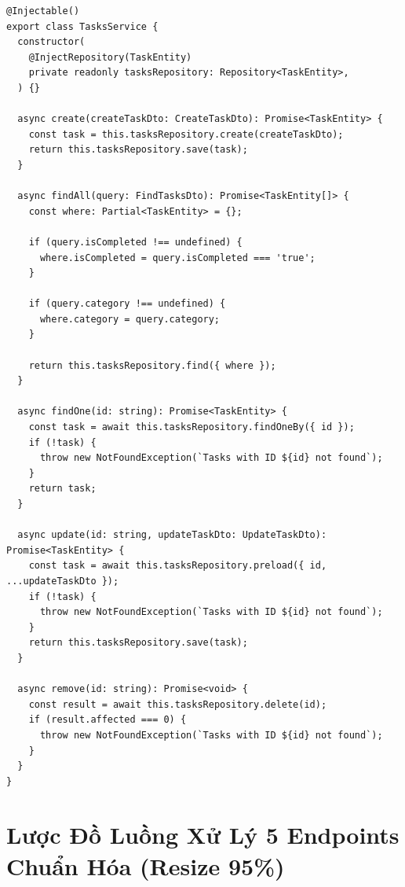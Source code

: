 \documentclass[12pt,a4paper,oneside]{book}
\begin{document}
\begin{codebox}
\begin{Verbatim}[fontsize=\small]
@Injectable()
export class TasksService {
  constructor(
    @InjectRepository(TaskEntity)
    private readonly tasksRepository: Repository<TaskEntity>,
  ) {}

  async create(createTaskDto: CreateTaskDto): Promise<TaskEntity> {
    const task = this.tasksRepository.create(createTaskDto);
    return this.tasksRepository.save(task);
  }

  async findAll(query: FindTasksDto): Promise<TaskEntity[]> {
    const where: Partial<TaskEntity> = {};

    if (query.isCompleted !== undefined) {
      where.isCompleted = query.isCompleted === 'true';
    }

    if (query.category !== undefined) {
      where.category = query.category;
    }

    return this.tasksRepository.find({ where });
  }

  async findOne(id: string): Promise<TaskEntity> {
    const task = await this.tasksRepository.findOneBy({ id });
    if (!task) {
      throw new NotFoundException(`Tasks with ID ${id} not found`);
    }
    return task;
  }

  async update(id: string, updateTaskDto: UpdateTaskDto): Promise<TaskEntity> {
    const task = await this.tasksRepository.preload({ id, ...updateTaskDto });
    if (!task) {
      throw new NotFoundException(`Tasks with ID ${id} not found`);
    }
    return this.tasksRepository.save(task);
  }

  async remove(id: string): Promise<void> {
    const result = await this.tasksRepository.delete(id);
    if (result.affected === 0) {
      throw new NotFoundException(`Tasks with ID ${id} not found`);
    }
  }
}
\end{Verbatim}
\end{codebox}

\section{Lược Đồ Luồng Xử Lý 5 Endpoints Chuẩn Hóa (Resize 95\%)}
\end{document}
